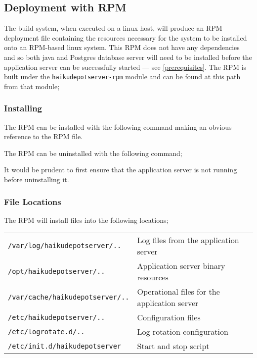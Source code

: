 \subsection{Deployment with RPM}

The build system, when executed on a linux host, will produce an RPM deployment file containing the resources necessary for the system to be installed onto an RPM-based linux system.  This RPM does not have any dependencies and so both java and Postgres database server will need to be installed before the application server can be successfully started --- see \ref{prerequisites}.  The RPM is built under the {\tt haikudepotserver-rpm} module and can be found at this path from that module;


\subsubsection{Installing}

The RPM can be installed with the following command making an obvious reference to the RPM file.


The RPM can be uninstalled with the following command;


It would be prudent to first ensure that the application server is not running before uninstalling it.

\subsubsection{File Locations}

The RPM will install files into the following locations;

\begin{tabular}{|l|l|}
\hline
{\tt /var/log/haikudepotserver/..} & Log files from the application server \\
{\tt /opt/haikudepotserver/..} & Application server binary resources \\
{\tt /var/cache/haikudepotserver/..} & Operational files for the application server \\
{\tt /etc/haikudepotserver/..} & Configuration files \\
{\tt /etc/logrotate.d/..} & Log rotation configuration \\
{\tt /etc/init.d/haikudepotserver} & Start and stop script \\
\hline
\end{tabular}

